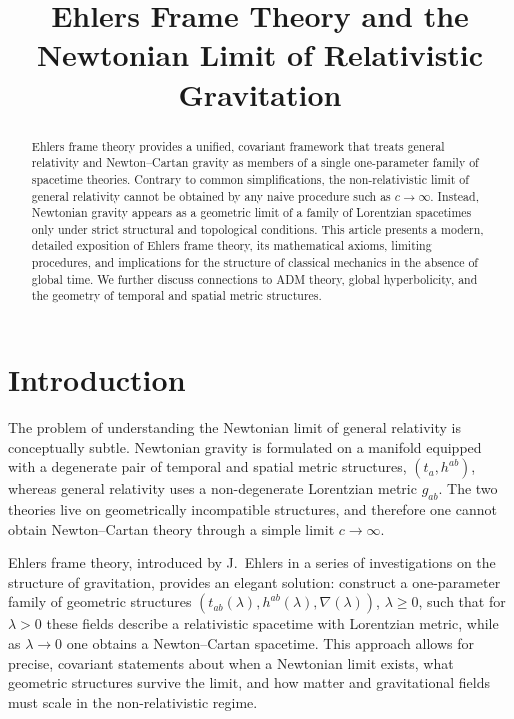 \documentclass[12pt]{article}
\title{\bf Ehlers Frame Theory and the Newtonian Limit of Relativistic Gravitation}
\author{ }
\date{ }
\begin{document}
\maketitle

\begin{abstract}
Ehlers frame theory provides a unified, covariant framework that treats
general relativity and Newton–Cartan gravity as members of a single
one-parameter family of spacetime theories. 
Contrary to common simplifications, the non-relativistic limit of general
relativity cannot be obtained by any naive procedure such as $c \to \infty$.
Instead, Newtonian gravity appears as a geometric limit of a family of 
Lorentzian spacetimes only under strict structural and topological conditions.
This article presents a modern, detailed exposition of Ehlers frame theory,
its mathematical axioms, limiting procedures, and implications for the
structure of classical mechanics in the absence of global time.
We further discuss connections to ADM theory, global hyperbolicity, and the 
geometry of temporal and spatial metric structures.
\end{abstract}

\tableofcontents

\section{Introduction}

The problem of understanding the Newtonian limit of general relativity is
conceptually subtle.
Newtonian gravity is formulated on a manifold equipped with a degenerate pair
of temporal and spatial metric structures, $(t_a, h^{ab})$, whereas general
relativity uses a non-degenerate Lorentzian metric $g_{ab}$.
The two theories live on geometrically incompatible structures, and therefore
one cannot obtain Newton–Cartan theory through a simple limit $c\to\infty$.

Ehlers frame theory, introduced by J.~Ehlers in a series of investigations on
the structure of gravitation, provides an elegant solution: construct a
one-parameter family of geometric structures $(t_{ab}(\lambda),
h^{ab}(\lambda),\nabla(\lambda))$, $\lambda \ge 0$, such that for $\lambda>0$
these fields describe a relativistic spacetime with Lorentzian metric, while
as $\lambda \to 0$ one obtains a Newton–Cartan spacetime.
This approach allows for precise, covariant statements about when a Newtonian
limit exists, what geometric structures survive the limit, and how matter and
gravitational fields must scale in the non-relativistic regime.
\end{document}
